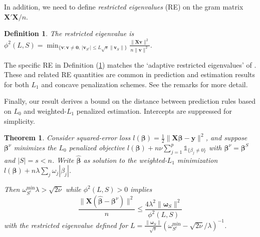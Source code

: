 \documentclass[12pt]{article}
\newtheorem{theorem}{\sc Theorem}[section]
\newtheorem{definition}{\sc Definition}[section]
\newcommand{\bs}[1]{\boldsymbol{#1}}
\newcommand{\mr}[1]{\mathrm{#1}}
\newcommand{\bm}[1]{\mathbf{#1}}
\newcommand{\ds}[1]{\mathds{#1}}
\begin{document}
In addition, we need to define {\it restricted eigenvalues} (RE) on the gram matrix $\bm{X}'\bm{X}/n$.  
\begin{definition}\label{redef}
The restricted eigenvalue is
$
\phi^2(L,S) = \min_{\{\bm{v}: \bm{v}\neq \bm{0},~|\bm{v}_{S^c}| \leq L\sqrt{s}\|\bm{v}_S\|\}}\frac{\|\bm{X}\bm{v}\|^2}{n\|\bm{v}\|^2}$.
\end{definition}
\noindent The specific RE in Definition (\ref{redef}) matches the `adaptive restricted eigenvalues' of \cite{buhlmann_statistics_2011}.  These and related RE quantities are common in prediction and estimation results for both $L_1$ and concave penalization schemes.  See the remarks for more detail.

Finally, our result derives a bound on the distance between prediction rules based on $L_0$ and weighted-$L_1$ penalized estimation.  Intercepts are suppressed for simplicity.
\begin{theorem} \label{sparseapprox}  Consider squared-error loss $l(\bs{\beta}) =
\frac{1}{2}\|\bm{X}\bs{\beta}-\bm{y}\|^2$, and suppose $\bs{\beta}^{\nu}$ minimizes the $L_0$ penalized objective $l(\bs{\beta}) + n\nu\sum_{j=1}^p\ds{1}_{\{\beta_j\neq0\}}$ with $\bs{\beta}^\nu = \bs{\beta}^S$ and $|S|=s<n$.   
Write $\bs{\hat\beta}$ as solution to the weighted-$L_1$ minimization $l(\bs{\beta}) + n\lambda\sum_j\omega_j|\beta_j|$. 

Then  
$\omega^{\mr{min}}_{S^c}\lambda > \sqrt{2\nu}$ while $\phi^2(L,S) > 0$ implies
\begin{equation} \label{sparseineq}
\frac{\|\bm{X}(\bs{\hat\beta}-\bs{\beta}^\nu)\|^2}{n}\leq
\frac{4\lambda^2 \|\bs{\omega}_S\|^2}{\phi^2(L, S)}
\end{equation} 
with the restricted eigenvalue defined for 
 $L = \frac{\|\bs{\omega}_S\|}{\sqrt{s}}\left(\omega^{\mr{min}}_{S^c}-\sqrt{2\nu}/\lambda\right)^{-1}$.
\end{theorem}
\end{document}
